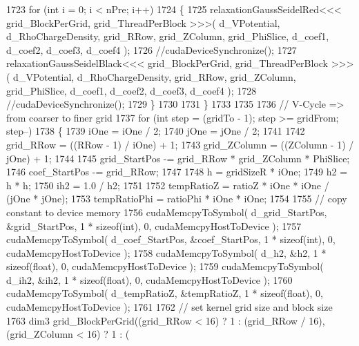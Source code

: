 \begin{DoxyCode}
1723             \textcolor{keywordflow}{for} (\textcolor{keywordtype}{int} i = 0; i < nPre; i++)
1724             \{
1725                 relaxationGaussSeidelRed<<< grid\_BlockPerGrid, grid\_ThreadPerBlock >>>( d\_VPotential, 
      d\_RhoChargeDensity, grid\_RRow, grid\_ZColumn, grid\_PhiSlice, d\_coef1, d\_coef2, d\_coef3, d\_coef4 );
1726                 \textcolor{comment}{//cudaDeviceSynchronize();}
1727                 relaxationGaussSeidelBlack<<< grid\_BlockPerGrid, grid\_ThreadPerBlock >>>( d\_VPotential, 
      d\_RhoChargeDensity, grid\_RRow, grid\_ZColumn, grid\_PhiSlice, d\_coef1, d\_coef2, d\_coef3, d\_coef4 );
1728                 \textcolor{comment}{//cudaDeviceSynchronize();}
1729             \}
1730             
1731         \}
1733 
1735 
1736         \textcolor{comment}{// V-Cycle => from coarser to finer grid}
1737         \textcolor{keywordflow}{for} (\textcolor{keywordtype}{int} step = (gridTo - 1); step >= gridFrom; step--)
1738         \{
1739             iOne = iOne / 2;
1740             jOne = jOne / 2;
1741         
1742             grid\_RRow       = ((RRow - 1) / iOne) + 1;
1743             grid\_ZColumn    = ((ZColumn - 1) / jOne) + 1;
1744 
1745             grid\_StartPos -= grid\_RRow * grid\_ZColumn * PhiSlice;
1746             coef\_StartPos -= grid\_RRow;
1747         
1748             h   = gridSizeR * iOne;
1749             h2  = h * h;
1750             ih2 = 1.0 / h2;
1751         
1752             tempRatioZ = ratioZ * iOne * iOne / (jOne * jOne);
1753             tempRatioPhi = ratioPhi * iOne * iOne;
1754 
1755             \textcolor{comment}{// copy constant to device memory}
1756             cudaMemcpyToSymbol( d\_grid\_StartPos, &grid\_StartPos, 1 * \textcolor{keyword}{sizeof}(\textcolor{keywordtype}{int}), 0, cudaMemcpyHostToDevice
       );
1757             cudaMemcpyToSymbol( d\_coef\_StartPos, &coef\_StartPos, 1 * \textcolor{keyword}{sizeof}(\textcolor{keywordtype}{int}), 0, cudaMemcpyHostToDevice
       );
1758             cudaMemcpyToSymbol( d\_h2, &h2, 1 * \textcolor{keyword}{sizeof}(\textcolor{keywordtype}{float}), 0, cudaMemcpyHostToDevice );
1759             cudaMemcpyToSymbol( d\_ih2, &ih2, 1 * \textcolor{keyword}{sizeof}(\textcolor{keywordtype}{float}), 0, cudaMemcpyHostToDevice );
1760             cudaMemcpyToSymbol( d\_tempRatioZ, &tempRatioZ, 1 * \textcolor{keyword}{sizeof}(\textcolor{keywordtype}{float}), 0, cudaMemcpyHostToDevice );
1761 
1762             \textcolor{comment}{// set kernel grid size and block size}
1763             dim3 grid\_BlockPerGrid((grid\_RRow < 16) ? 1 : (grid\_RRow / 16), (grid\_ZColumn < 16) ? 1 : (

\end{DoxyCode}
